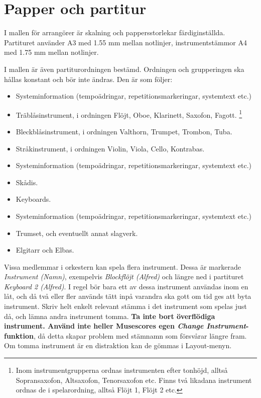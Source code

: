 \newpage
\section{Papper och partitur}
I mallen för arrangörer är skalning och pappersstorlekar färdiginställda. Partituret använder A3 med 1.55 mm mellan notlinjer, instrumentstämmor A4 med 1.75 mm mellan notlinjer. 

I mallen är även partiturordningen bestämd. Ordningen och grupperingen ska hållas konstant och bör inte ändras. Den är som följer:
\begin{itemize}
    \item Systeminformation (tempoädringar, repetitionsmarkeringar, systemtext etc.)
    \item Träblåsinstrument, i ordningen Flöjt, Oboe, Klarinett, Saxofon, Fagott. \footnote{\label{inom}Inom instrumentgrupperna ordnas instrumenten efter tonhöjd, alltså Sopransaxofon, Altsaxofon, Tenorsaxofon etc. Finns två likadana instrument ordnas de i spelarordning, alltså Flöjt 1, Flöjt 2 etc.}
    \item Bleckblåsinstrument, i ordningen Valthorn, Trumpet, Trombon, Tuba. \footnotemark[1]
    \item Stråkinstrument, i ordningen Violin, Viola, Cello, Kontrabas. \footnotemark[1]
    \item Systeminformation (tempoädringar, repetitionsmarkeringar, systemtext etc.)
    \item Skådis.
    \item Keyboards.
    \item Systeminformation (tempoädringar, repetitionsmarkeringar, systemtext etc.)
    \item Trumset, och eventuellt annat slagverk.
    \item Elgitarr och Elbas.
\end{itemize}

Vissa medlemmar i orkestern kan spela flera instrument. Dessa är markerade \textit{Instrument (Namn)}, exempelvis \textit{Blockflöjt (Alfred)} och längre ned i partituret \textit{Keyboard 2 (Alfred)}. I regel bör bara ett av dessa instrument användas inom en låt, och då två eller fler används tätt inpå varandra ska gott om tid ges att byta instrument. Skriv helt enkelt relevant stämma i det instrument som spelas just då, och lämna andra instrument tomma. \textbf{Ta inte bort överflödiga instrument. Använd inte heller Musescores egen \textit{Change Instrument}-funktion}, då detta skapar problem med stämnamn som försvårar längre fram. Om tomma instrument är en distraktion kan de gömmas i Layout-menyn.

